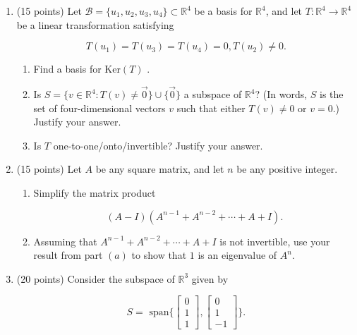 \documentclass[12 pt]{report}
\begin{document}
\begin{enumerate}

\item (15 points) Let $\mathcal{B} = \{u_1, u_2, u_3, u_4\} \subset \mathbb{R}^4$ be a basis for $\mathbb{R}^4$, and let $T: \mathbb{R}^4 \to \mathbb{R}^4$ be a linear transformation satisfying

\[
T(u_1) = T(u_3) = T(u_4) = 0, T(u_2) \neq 0.
\]

\begin{enumerate} \item Find a basis for Ker$(T)$ .

\vfill

\item Is $S=\{v \in \mathbb{R}^4: T(v) \neq \vec{0}\} \cup \{ \vec{0} \}$ a subspace of $\mathbb{R}^4$? (In words, $S$ is the set of four-dimensional vectors $v$ such that either $T(v) \neq 0$ or $v = 0$.) Justify your answer. 

\vfill

\item Is $T$ one-to-one/onto/invertible? Justify your answer. 

\vfill

\end{enumerate} 

\newpage

\item(15 points) Let $A$ be any square matrix, and let $n$ be any positive integer.

\begin{enumerate}\item Simplify the matrix product 

\[
(A-I)(A^{n-1}+A^{n-2} + \cdots + A + I).
\]

\vfill

\item Assuming that $A^{n-1}+A^{n-2}+\cdots+A+I$ is not invertible, use your result from part $(a)$ to show that $1$ is an eigenvalue of $A^n$. 

\vfill
\end{enumerate}

\newpage

\item(20 points) Consider the subspace of $\mathbb{R}^3$ given by 

\[
S = \text{ span}\Big\{ \begin{bmatrix} 0 \\ 1 \\ 1 \end{bmatrix}, \begin{bmatrix} 0 \\ 1 \\ -1 \end{bmatrix} \Big\}.
\]


\end{enumerate}
\end{document}
